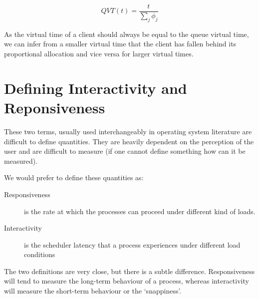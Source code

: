 \begin{equation}
  QVT(t) = \frac{t}{\sum_j\phi_j}
\end{equation}

As the virtual time of a client should always be equal to the queue virtual time, we can
infer from a smaller virtual time that the client has fallen behind its proportional allocation
and vice versa for larger virtual times.


\section{Defining Interactivity and Reponsiveness}

These two terms, usually used interchangeably in operating system literature are difficult to define quantities.
They are heavily dependent on the perception of the user and are difficult to measure (if one cannot define 
something how can it be measured).

We would prefer to define these quantities as:
\begin{description}
\item[Responsiveness] is the rate at which the processes can proceed under different kind of loads.
\item[Interactivity] is the scheduler latency that a process experiences under different load conditions
\end{description}

The two definitions are very close, but there is a subtle difference. Responsiveness will tend to measure the long-term
behaviour of a process, whereas interactivity will measure the short-term behaviour or the `snappiness'.

